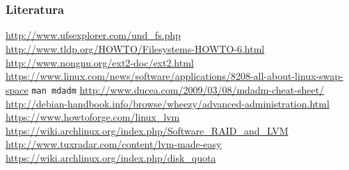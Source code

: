\documentclass[t]{beamer}
\begin{document}
\section*{}
\begin{frame}
	\frametitle{Literatura}
    \url{http://www.ufsexplorer.com/und_fs.php}
    \url{http://www.tldp.org/HOWTO/Filesystems-HOWTO-6.html}
    \url{http://www.nongnu.org/ext2-doc/ext2.html}
    \url{https://www.linux.com/news/software/applications/8208-all-about-linux-swap-space}
	\texttt{man mdadm}
	\url{http://www.ducea.com/2009/03/08/mdadm-cheat-sheet/}
	\vfill
	\url{http://debian-handbook.info/browse/wheezy/advanced-administration.html}\\
	\url{https://www.howtoforge.com/linux_lvm}
	\url{https://wiki.archlinux.org/index.php/Software_RAID_and_LVM}\\
	\url{http://www.tuxradar.com/content/lvm-made-easy}
	\vfill
	\url{https://wiki.archlinux.org/index.php/disk_quota}
\end{frame}
\end{document}
